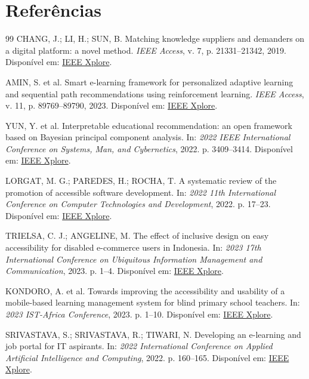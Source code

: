 \documentclass[12pt,oneside,a4paper,article]{abntex2}
\begin{document}
\section{Referências}
\begin{thebibliography}{99}
 CHANG, J.; LI, H.; SUN, B. Matching knowledge suppliers and demanders on a digital platform: a novel method. \textit{IEEE Access}, v. 7, p. 21331--21342, 2019. Disponível em: \href{https://ieeexplore.ieee.org/document/8628950}{IEEE Xplore}.

 AMIN, S. et al. Smart e-learning framework for personalized adaptive learning and sequential path recommendations using reinforcement learning. \textit{IEEE Access}, v. 11, p. 89769--89790, 2023. Disponível em: \href{https://ieeexplore.ieee.org/document/10220065}{IEEE Xplore}.

 YUN, Y. et al. Interpretable educational recommendation: an open framework based on Bayesian principal component analysis. In: \textit{2022 IEEE International Conference on Systems, Man, and Cybernetics}, 2022. p. 3409--3414. Disponível em: \href{https://ieeexplore.ieee.org/document/9945498}{IEEE Xplore}.

 LORGAT, M. G.; PAREDES, H.; ROCHA, T. A systematic review of the promotion of accessible software development. In: \textit{2022 11th International Conference on Computer Technologies and Development}, 2022. p. 17--23. Disponível em: \href{https://ieeexplore.ieee.org/document/10153876}{IEEE Xplore}.

 TRIELSA, C. J.; ANGELINE, M. The effect of inclusive design on easy accessibility for disabled e-commerce users in Indonesia. In: \textit{2023 17th International Conference on Ubiquitous Information Management and Communication}, 2023. p. 1--4. Disponível em: \href{https://ieeexplore.ieee.org/document/10035640}{IEEE Xplore}.

 KONDORO, A. et al. Towards improving the accessibility and usability of a mobile-based learning management system for blind primary school teachers. In: \textit{2023 IST-Africa Conference}, 2023. p. 1--10. Disponível em: \href{https://ieeexplore.ieee.org/document/10187797}{IEEE Xplore}.

 SRIVASTAVA, S.; SRIVASTAVA, R.; TIWARI, N. Developing an e-learning and job portal for IT aspirants. In: \textit{2022 International Conference on Applied Artificial Intelligence and Computing}, 2022. p. 160--165. Disponível em: \href{https://ieeexplore.ieee.org/document/9792727}{IEEE Xplore}.


\end{thebibliography}
\end{document}
